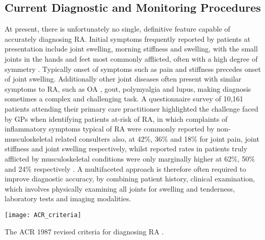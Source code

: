 \documentclass[twoside]{bhamthesis}
\theoremstyle{definition}
\begin{document}

\subsection{Current Diagnostic and Monitoring Procedures}

\label{Current Diagnostic and Monitoring Procedures}

At present, there is unfortunately no single, definitive feature capable of accurately diagnosing RA. Initial symptoms frequently reported by patients at presentation include joint swelling, morning stiffness and swelling, with the small joints in the hands and feet most commonly afflicted, often with a high degree of symmetry \cite{arnett1988american}. Typically onset of symptoms such as pain and stiffness precedes onset of joint swelling. Additionally other joint diseases often present with similar symptoms to RA, such as OA \cite{santos2012osteoarthritis}, gout, polymyalgia and lupus, making diagnosis sometimes a complex and challenging task. A questionnaire survey of 10,161 patients attending their primary care practitioner highlighted the challenge faced by GPs when identifying patients at-risk of RA, in which complaints of inflammatory symptoms typical of RA were commonly reported by non-musculoskeletal related consulters also, at 42\%, 36\% and 18\% for joint pain, joint stiffness and joint swelling respectively, whilst reported rates in patients truly afflicted by musculoskeletal conditions were only marginally higher at 62\%, 50\% and 24\% respectively \cite{hider2019symptoms}. A multifaceted approach is therefore often required to improve diagnostic accuracy, by combining patient history, clinical examination, which involves physically examining all joints for swelling and tenderness, laboratory tests and imaging modalities. 

\begin{table}[!ht]
\centering
  \texttt{[image: ACR\_criteria]}
\caption[The ACR 1987 revised criteria for diagnosing RA.]{The ACR 1987 revised criteria for diagnosing RA \cite{arnett1988american}.}
\label{fig:Breast_and_brain}
\end{table}
\end{document}
